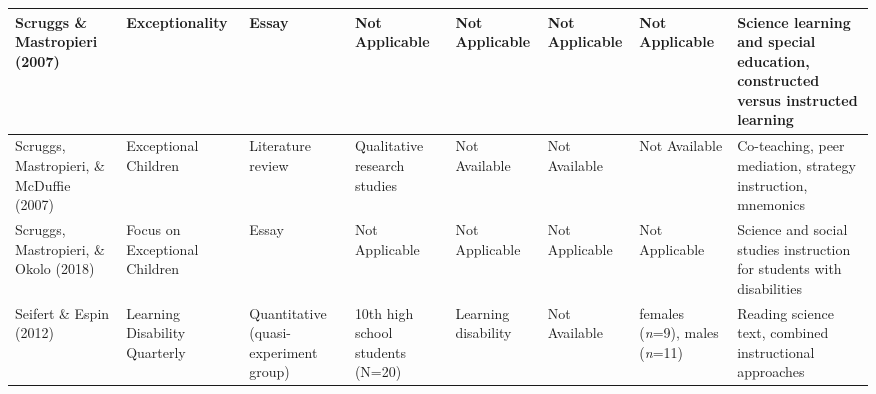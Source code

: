 \documentclass[11.5pt]{sig-alternate}
\begin{document}
\begin{@twocolumnfalse}
\begin{table}
\begin{tabular}{m{0.72in}m{0.72in}m{0.72in}m{0.72in}m{0.72in}m{0.72in}m{0.72in}m{0.72in}}
Scruggs \& Mastropieri (2007)                           & Exceptionality                                                  & Essay                                 &  \centering Not Applicable                                                                               &  \centering Not Applicable                                    &  \centering Not Applicable                                                                                         &  \centering Not Applicable                                                   & Science learning and special education, constructed versus instructed learning                           \\ \hline
Scruggs, Mastropieri, \& McDuffie (2007)                & Exceptional Children                                            & Literature review                     & Qualitative research studies                                                                 &  \centering Not Available                                     &  \centering Not Available                                                                                          &  \centering Not Available                                                    & Co-teaching, peer mediation, strategy instruction, mnemonics                                             \\ \hline
Scruggs, Mastropieri, \&  Okolo (2018)               & Focus on Exceptional Children                                   & Essay                                 &  \centering Not Applicable                                                                               &  \centering Not Applicable                                    &  \centering Not Applicable                                                                                         &  \centering Not Applicable                                                   & Science and social studies instruction for students with disabilities                                    \\ \hline
Seifert \&  Espin (2012)                             & Learning Disability Quarterly                                   & Quantitative (quasi-experiment group) & 10th high school students (N=20)                                                             & Learning disability                               &  \centering Not Available                                                                                          & females (\textit{n}=9), males (\textit{n}=11)                                      & Reading science text, combined instructional approaches                                                  \\ \hline

\end{tabular}
\end{table}
\end{@twocolumnfalse}
\end{document}
